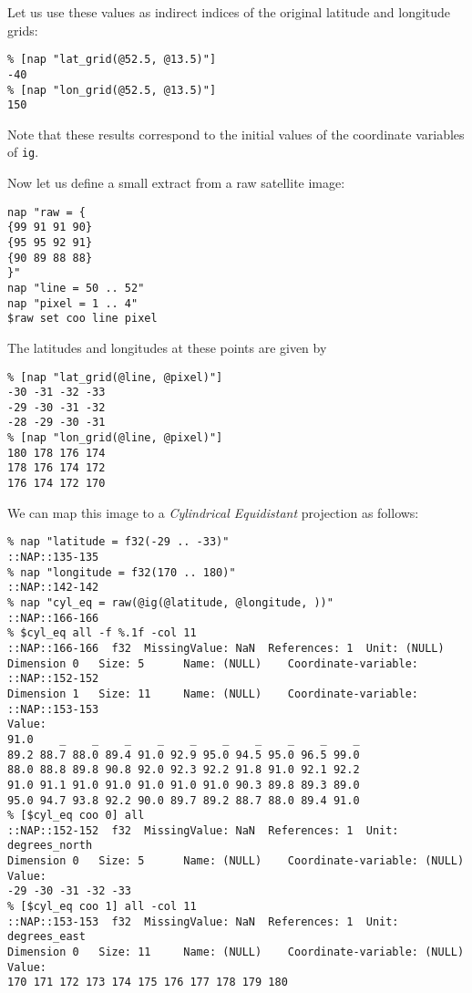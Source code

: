 Let us use these values as indirect indices of the original
latitude and longitude grids:
  \begin{verbatim}
% [nap "lat_grid(@52.5, @13.5)"]
-40
% [nap "lon_grid(@52.5, @13.5)"]
150
\end{verbatim}

Note that these results correspond to the initial values of the
coordinate variables of 
  \texttt{ig}.
  \par Now let us define a small extract from a raw satellite image:
  \begin{verbatim}
nap "raw = {
{99 91 91 90}
{95 95 92 91}
{90 89 88 88}
}"
nap "line = 50 .. 52"
nap "pixel = 1 .. 4"
$raw set coo line pixel
\end{verbatim}

  \par The latitudes and longitudes at these points are given by
  \begin{verbatim}
% [nap "lat_grid(@line, @pixel)"]
-30 -31 -32 -33
-29 -30 -31 -32
-28 -29 -30 -31
% [nap "lon_grid(@line, @pixel)"]
180 178 176 174
178 176 174 172
176 174 172 170
\end{verbatim}

  \par We can map this image to a 
  \textit{Cylindrical Equidistant} projection as follows:
  \begin{verbatim}
% nap "latitude = f32(-29 .. -33)"
::NAP::135-135
% nap "longitude = f32(170 .. 180)"
::NAP::142-142
% nap "cyl_eq = raw(@ig(@latitude, @longitude, ))"
::NAP::166-166
% $cyl_eq all -f %.1f -col 11
::NAP::166-166  f32  MissingValue: NaN  References: 1  Unit: (NULL)
Dimension 0   Size: 5      Name: (NULL)    Coordinate-variable: ::NAP::152-152
Dimension 1   Size: 11     Name: (NULL)    Coordinate-variable: ::NAP::153-153
Value:
91.0    _    _    _    _    _    _    _    _    _    _
89.2 88.7 88.0 89.4 91.0 92.9 95.0 94.5 95.0 96.5 99.0
88.0 88.8 89.8 90.8 92.0 92.3 92.2 91.8 91.0 92.1 92.2
91.0 91.1 91.0 91.0 91.0 91.0 91.0 90.3 89.8 89.3 89.0
95.0 94.7 93.8 92.2 90.0 89.7 89.2 88.7 88.0 89.4 91.0
% [$cyl_eq coo 0] all
::NAP::152-152  f32  MissingValue: NaN  References: 1  Unit: degrees_north
Dimension 0   Size: 5      Name: (NULL)    Coordinate-variable: (NULL)
Value:
-29 -30 -31 -32 -33
% [$cyl_eq coo 1] all -col 11
::NAP::153-153  f32  MissingValue: NaN  References: 1  Unit: degrees_east
Dimension 0   Size: 11     Name: (NULL)    Coordinate-variable: (NULL)
Value:
170 171 172 173 174 175 176 177 178 179 180
\end{verbatim}

